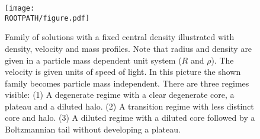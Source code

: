 \begin{figure}%
	\centering%
	\texttt{[image: \\ROOTPATH/figure.pdf]}
	\caption{Family of solutions with a fixed central density illustrated with density, velocity and mass profiles. Note that radius and density are given in a particle mass dependent unit system ($R$ and $\rho$). The velocity is given units of speed of light. In this picture the shown family becomes particle mass independent. There are three regimes visible: (1) A degenerate regime with a clear degenerate core, a plateau and a diluted halo. (2) A transition regime with less distinct core and halo. (3) A diluted regime with a diluted core followed by a Boltzmannian tail without developing a plateau.}%
	\label{fig:profiles:without-cutoff:central-density:raw}%
\end{figure}
